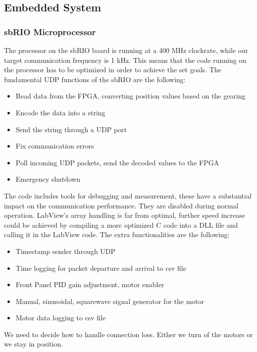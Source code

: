 \subsection{Embedded System}
\label{Embedded}
\subsubsection{sbRIO Microprocessor}

The processor on the sbRIO board is running at a 400 MHz clockrate, while our target communication frequency is 1 kHz. This means that the code running on the processor has to be optimized in order to achieve the set goals. The fundamental UDP functions of the sbRIO are the following:

\begin{itemize}
	\setlength\itemsep{0em}
	\item Read data from the FPGA, converting position values based on the gearing
	\item Encode the data into a string
	\item Send the string through a UDP port
	\item Fix communication errors
	\item Poll incoming UDP packets, send the decoded values to the FPGA
	\item Emergency shutdown	
\end{itemize}


The code includes tools for debugging and measurement, these have a substantial impact on the communication performance. They are disabled during normal operation. LabView's array handling is far from optimal, further speed increase could be achieved by compiling a more optimized C code into a DLL file and calling it in the LabView code. The extra functionalities are the following:

\begin{itemize}	
	\setlength\itemsep{0em}
	\item Timestamp sender through UDP
	\item Time logging for packet departure and arrival to csv file
	\item Front Panel PID gain adjustment, motor enabler
	\item Manual, sinusoidal, squarewave signal generator for the motor
	\item Motor data logging to csv file
	
\end{itemize}

We need to decide how to handle connection loss. Either we turn of the motors or we stay in position.

